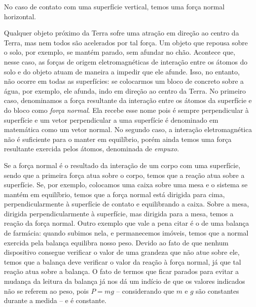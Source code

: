 \begin{marginfigure}
\centering
{}
\caption{No caso de contato com uma superfície vertical, temos uma força normal horizontal.}
\end{marginfigure}

Qualquer objeto próximo da Terra sofre uma atração em direção ao centro da Terra, mas nem todos são acelerados por tal força. Um objeto que repousa sobre o solo, por exemplo, se mantém parado, sem afundar no chão. Acontece que, nesse caso, as forças de origem eletromagnéticas de interação entre os átomos do solo e do objeto atuam de maneira a impedir que ele afunde. Isso, no entanto, não ocorre em todas as superfícies: se colocarmos um bloco de concreto sobre a água, por exemplo, ele afunda, indo em direção ao centro da Terra. No primeiro caso, denominamos a força resultante da interação entre os átomos da superfície e do bloco como \emph{força normal}. Ela recebe esse nome pois é sempre perpendicular à superfície e um vetor perpendicular a uma superfície é denominado em matemática como um vetor normal. No segundo caso, a interação eletromagnética não é suficiente para o manter em equilíbrio, porém ainda temos uma força resultante exercida pelos átomos, denominada de \emph{empuxo}.


Se a força normal é o resultado da interação de um corpo com uma superfície, sendo que a primeira força atua sobre o corpo, temos que a reação atua sobre a superfície. Se, por exemplo, colocamos uma caixa sobre uma mesa e o sistema se mantém em equilíbrio, temos que a força normal está dirigida para cima, perpendicularmente à superfície de contato e equilibrando a caixa. Sobre a mesa, dirigida perpendicularmente à superfície, mas dirigida para a mesa, temos a reação da força normal. Outro exemplo que vale a pena citar é o de uma balança de farmácia: quando subimos nela, e permanecemos imóveis, temos que a normal exercida pela balança equilibra nosso peso.  Devido ao fato de que nenhum dispositivo consegue verificar o valor de uma grandeza que não atue sobre ele, temos que a balança deve verificar o valor da reação à força normal, já que tal reação atua sobre a balança. O fato de termos que ficar parados para evitar a mudança da leitura da balança já nos dá um indício de que os valores indicados não se referem ao peso, pois $P = mg$ -- considerando que $m$ e $g$ são constantes durante a medida -- e é constante.


